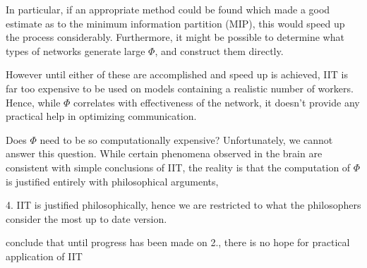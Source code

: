 In particular, if an appropriate method could be found which made a good estimate as to the minimum information partition (MIP), this would speed up the process considerably. Furthermore, it might be possible to determine what types of networks generate large $\Phi$, and construct them directly.

However until either of these are accomplished and speed up is achieved, IIT is far too expensive to be used on models containing a realistic number of workers. Hence, while $\Phi$ correlates with effectiveness of the network, it doesn't provide any practical help in optimizing communication.

Does $\Phi$ need to be so computationally expensive? Unfortunately, we cannot answer this question. While certain phenomena observed in the brain are consistent with simple conclusions of IIT, the reality is that the computation of $\Phi$ is justified entirely with philosophical arguments, 

4. IIT is justified philosophically, hence we are restricted to what the philosophers consider the most up to date version.

conclude that until progress has been made on 2., there is no hope for practical application of IIT

